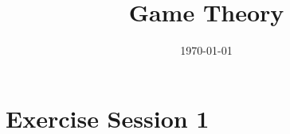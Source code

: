 \documentclass[a4paper, 11pt, oneside]{article}
\title{Game Theory}
\date{\today}
\author{}
\numberwithin{question}{section}
\theoremstyle{definition}
\numberwithin{solution}{section}
\begin{document}
\maketitle
\newpage

\tableofcontents
\newpage

\section{Exercise Session 1}

\end{document}
